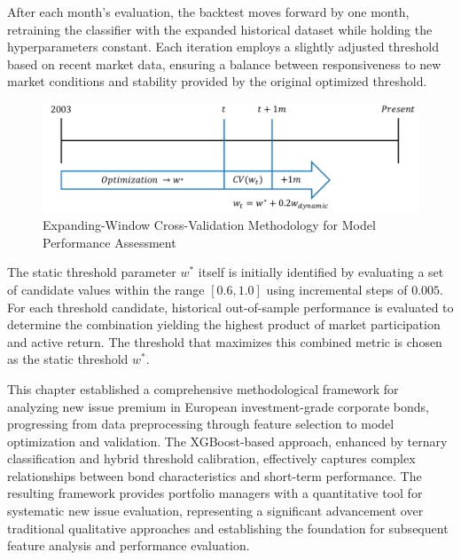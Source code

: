 After each month's evaluation, the backtest moves forward by one month, retraining the classifier with the expanded historical dataset while holding the hyperparameters constant. Each iteration employs a slightly adjusted threshold based on recent market data, ensuring a balance between responsiveness to new market conditions and stability provided by the original optimized threshold.

\begin{figure}[h]
    \begin{center}
        \includegraphics[width=\textwidth]{images/backtest_timeline.pdf}
    \end{center}
    \caption{Expanding-Window Cross-Validation Methodology for Model Performance Assessment}
    \label{fig:backtest_timeline}
\end{figure}

The static threshold parameter $w^*$ itself is initially identified by evaluating a set of candidate values within the range $[0.6, 1.0]$ using incremental steps of $0.005$. For each threshold candidate, historical out-of-sample performance is evaluated to determine the combination yielding the highest product of market participation and active return. The threshold that maximizes this combined metric is chosen as the static threshold $w^*$.

This chapter established a comprehensive methodological framework for analyzing new issue premium in European investment-grade corporate bonds, progressing from data preprocessing through feature selection to model optimization and validation. The XGBoost-based approach, enhanced by ternary classification and hybrid threshold calibration, effectively captures complex relationships between bond characteristics and short-term performance. The resulting framework provides portfolio managers with a quantitative tool for systematic new issue evaluation, representing a significant advancement over traditional qualitative approaches and establishing the foundation for subsequent feature analysis and performance evaluation.